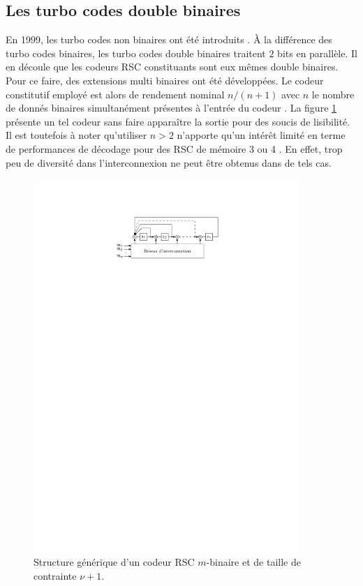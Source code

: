 \subsection{Les turbo codes double binaires}\label{sec:dbl}
En 1999, les turbo codes non binaires ont été introduits \cite{doublebin1}. À la différence des turbo codes binaires, les 
turbo codes double binaires traitent $2$ bits en parallèle. Il en découle que les codeurs RSC constituants sont eux mêmes 
double binaires. Pour ce faire, des extensions multi binaires ont été développées. Le codeur constitutif employé est alors 
de rendement nominal $n/(n+1)$ avec $n$ le nombre de donnés binaires simultanément présentes à l'entrée du codeur \cite{doublebin3}. 
La figure \ref{fig:encMulti} présente un tel codeur sans faire apparaître la sortie pour des soucis de lisibilité. Il est 
toutefois à noter qu'utiliser $n > 2$ n'apporte qu'un intérêt limité en terme de performances de décodage pour des RSC de mémoire 3 ou 4 \cite{Balta2013}. En 
effet, trop peu de diversité dans l'interconnexion ne peut être obtenus dans de tels cas.
\begin{figure}[!h]
	\centering
	\includegraphics[width=10cm]{main/ch1_fig/encMulti.pdf}
	\caption{\label{fig:encMulti} Structure générique d'un codeur RSC $m$-binaire et de taille de contrainte $\nu +1$.}
\end{figure}

